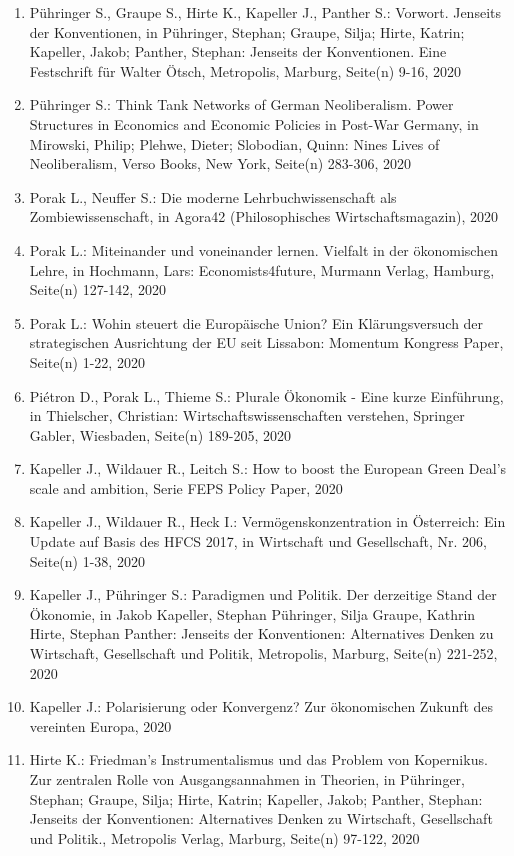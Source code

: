 \begin{enumerate}
	 \item Pühringer S., Graupe S., Hirte K., Kapeller J., Panther S.: Vorwort. Jenseits der Konventionen, in Pühringer, Stephan; Graupe, Silja; Hirte, Katrin; Kapeller, Jakob; Panther, Stephan: Jenseits der Konventionen. Eine Festschrift für Walter Ötsch, Metropolis, Marburg, Seite(n) 9-16, 2020
	 \item Pühringer S.: Think Tank Networks of German Neoliberalism. Power Structures in Economics and Economic Policies in Post-War Germany, in Mirowski, Philip; Plehwe, Dieter; Slobodian, Quinn: Nines Lives of Neoliberalism, Verso Books, New York, Seite(n) 283-306, 2020
	 \item Porak L., Neuffer S.: Die moderne Lehrbuchwissenschaft als Zombiewissenschaft, in Agora42 (Philosophisches Wirtschaftsmagazin), 2020
	 \item Porak L.: Miteinander und voneinander lernen. Vielfalt in der ökonomischen Lehre, in Hochmann, Lars: Economists4future, Murmann Verlag, Hamburg, Seite(n) 127-142, 2020
	 \item Porak L.: Wohin steuert die Europäische Union? Ein Klärungsversuch der strategischen Ausrichtung der EU seit Lissabon: Momentum Kongress Paper, Seite(n) 1-22, 2020
	 \item Piétron D., Porak L., Thieme S.: Plurale Ökonomik - Eine kurze Einführung, in Thielscher, Christian: Wirtschaftswissenschaften verstehen, Springer Gabler, Wiesbaden, Seite(n) 189-205, 2020
	 \item Kapeller J., Wildauer R., Leitch S.: How to boost the European Green Deal’s scale and ambition, Serie FEPS Policy Paper, 2020
	 \item Kapeller J., Wildauer R., Heck I.: Vermögenskonzentration in Österreich: Ein Update auf Basis des HFCS 2017, in Wirtschaft und Gesellschaft, Nr. 206, Seite(n) 1-38, 2020
	 \item Kapeller J., Pühringer S.: Paradigmen und Politik. Der derzeitige Stand der Ökonomie, in Jakob Kapeller, Stephan Pühringer, Silja Graupe, Kathrin Hirte, Stephan Panther: Jenseits der Konventionen: Alternatives Denken zu Wirtschaft, Gesellschaft und Politik, Metropolis, Marburg, Seite(n) 221-252, 2020
	 \item Kapeller J.: Polarisierung oder Konvergenz? Zur ökonomischen Zukunft des vereinten Europa, 2020
	 \item Hirte K.: Friedman’s Instrumentalismus und das Problem von Kopernikus. Zur zentralen Rolle von Ausgangsannahmen in Theorien, in Pühringer, Stephan; Graupe, Silja; Hirte, Katrin; Kapeller, Jakob; Panther, Stephan: Jenseits der Konventionen: Alternatives Denken zu Wirtschaft, Gesellschaft und Politik., Metropolis Verlag, Marburg, Seite(n) 97-122, 2020

\end{enumerate}
